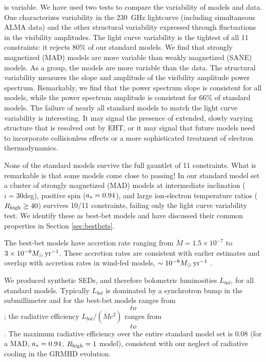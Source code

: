 \sgra is variable.  We have used two tests to compare the variability of models and data. One characterizes variability in the 230~GHz lightcurve (including simultaneous ALMA data) and the other structural variability expressed through fluctuations in the visibility amplitudes.  The light curve variability is the tightest of all 11 constraints: it rejects $80\%$ of our standard models.  We find that strongly magnetized (MAD) models are more variable than weakly magnetized (SANE) models.  As a group, the models are more variable than the data.  The structural variability measures the slope and amplitude of the visibility amplitude power spectrum.  Remarkably, we find that the power spectrum slope is consistent for all models, while the power spectrum amplitude is consistent for 66\% of standard models.  The failure of nearly all standard models to match the light curve variability is interesting.  It may signal the presence of extended, slowly varying structure that is resolved out by EHT, or it may signal that future models need to incorporate collisionless effects or a more sophisticated treatment of electron thermodynamics.   

None of the standard models survive the full gauntlet of 11 constraints.  What is remarkable is that some models come close to passing!  In our standard model set a cluster of strongly magnetized (MAD) models at intermediate inclination ($i = 30$deg), positive spin ($a_* = 0.94$), and large ion-electron temperature ratios ($R_\mathrm{high} \ge 40$) survives 10/11 constraints, failing only the light curve variability test.  We identify these as best-bet models and have discussed their common properties in Section \ref{sec:bestbets}.

The best-bet models have accretion rate ranging from $\dot{M} = 1.5 \times 10^{-7}$ to $3 \times 10^{-9} M_\odot \,\mathrm{yr}^{-1}$.  These accretion rates are consistent with earlier estimates and overlap with accretion rates in wind-fed models, $\sim 10^{-8} M_\odot\,\mathrm{yr}^{-1}$ \citep{2020ApJ...896L...6R}.  

We produced synthetic SEDs, and therefore bolometric luminosities $L_{bol}$, for all  standard models.  Typically $L_{bol}$ is dominated by a synchrotron bump in the submillimeter and for the best-bet models ranges from $$ to $$; the radiative  efficiency $L_{bol}/(\dot{M} c^2)$ ranges from $$ to $$.  The maximum radiative efficiency over the entire standard model set is $0.08$ (for a MAD, $a_* = 0.94$, $R_\mathrm{high} = 1$ model), consistent with our neglect of radiative cooling in the GRMHD evolution.  

